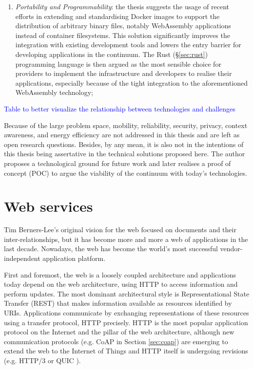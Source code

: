 \begin{enumerate}
    \item \emph{Portability and Programmability}: the thesis suggests the usage of recent efforts in extending and standardising Docker images to support the distribution of arbitrary binary files, notably WebAssembly applications instead of container filesystems. This solution significantly improves the integration with existing development tools and lowers the entry barrier for developing applications in the continuum. The Rust (§\ref{sec:rust}) programming language is then argued as the most sensible choice for providers to implement the infrastructure and developers to realise their applications, especially because of the tight integration to the aforementioned WebAssembly technology;
\end{enumerate}

\textcolor{blue}{Table to better visualize the relationship between technologies and challenges}

Because of the large problem space, mobility, reliability, security, privacy, context awareness, and energy efficiency are not addressed in this thesis and are left as open research questions. Besides, by any mean, it is also not in the intentions of this thesis being assertative in the technical solutions proposed here. The author proposes a technological ground for future work and later realises a proof of concept (POC) to argue the viability of the continuum with today's technologies.

\section{Web services}
\label{sec:web}

Tim Berners-Lee's original vision for the web focused on documents and their inter-relationships, but it has become more and more a web of applications in the last decade. Nowadays, the web has become the world's most successful vendor-independent application platform.

First and foremost, the web is a loosely coupled architecture and applications today depend on the web architecture, using HTTP to access information and perform updates. The most dominant architectural style is Representational State Transfer (REST) \cite{rest} that makes information available as resources identified by URIs. Applications communicate by exchanging representations of these resources using a transfer protocol, HTTP precisely. HTTP is the most popular application protocol on the Internet and the pillar of the web architecture, although new communication protocols (e.g. CoAP in Section \ref{sec:coap}) are emerging to extend the web to the Internet of Things and HTTP itself is undergoing revisions (e.g. HTTP/3 or QUIC \cite{quic}).

